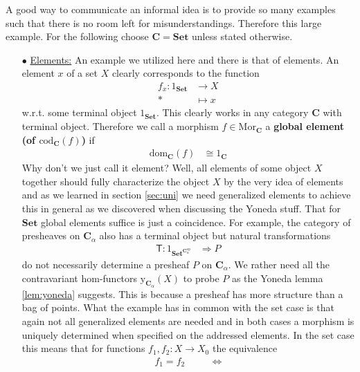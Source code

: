 \begin{exa}
\label{exa:ofinternaliz}
A good way to communicate an informal idea is to provide so many examples such that there is no room left for misunderstandings. Therefore this large example. For the following choose $\mathbf{C} = \mathbf{Set}$ unless stated otherwise.
\begin{enumerate}
\item[$\bullet$]
\underline{Elements:}
An example we utilized here and there is that of elements. An element $x$ of a set $X$ clearly corresponds to the function
\begin{align*}
  f_{x}
  \colon
  1_{\mathbf{Set}}
  &\rightarrow
  X
  \\
  \ast
  &\mapsto
  x
\end{align*}
w.r.t. some terminal object $1_{\mathbf{Set}}$. This clearly works in any category $\mathbf{C}$ with terminal object. Therefore we call a morphism $f \in \mathrm{Mor}_{\mathbf{C}}$ a \textbf{global element (of $\mathrm{cod}_{\mathbf{C}}(f)$)} if
\begin{align*}
  \mathrm{dom}_{\mathbf{C}}(f)
  &\cong
  1_{\mathbf{C}}
\end{align*}
Why don't we just call it {\glqq}element{\grqq}? Well, all elements of some object $X$ together should fully characterize the object $X$ by the very idea of elements and as we learned in section \ref{sec:uni} we need generalized elements to achieve this in general as we discovered when discussing the Yoneda stuff. That for $\mathbf{Set}$ global elements suffice is just a coincidence. For example, the category of presheaves on $\mathbf{C}_{\alpha}$ also has a terminal object but natural transformations
\begin{align*}
  \mathsf{T}
  \colon
  1_{\mathbf{Set}^{\mathbf{C}_{\alpha}^{\mathrm{op}}}}
  &\Rightarrow
  P
\end{align*}
do not necessarily determine a presheaf $P$ on $\mathbf{C}_{\alpha}$. We rather need all the contravariant hom-functors $\mathrm{y}_{\mathbf{C}_{\alpha}}(X)$ to probe $P$ as the Yoneda lemma \ref{lem:yoneda} suggests. This is because a presheaf has more structure than a bag of points. What the example has in common with the set case is that again not all generalized elements are needed and in both cases a morphism is uniquely determined when specified on the addressed elements. In the set case this means that for functions $f_{1},f_{2} \colon X \rightarrow X_{0}$ the equivalence
\begin{align*}
  f_{1}
  =
  f_{2}
  \qquad
  &\Leftrightarrow

\end{align*}
\end{enumerate}
\end{exa}
